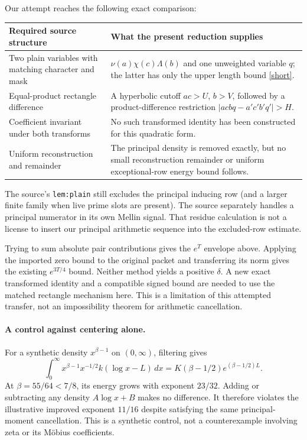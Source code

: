 \documentclass[11pt]{article}
\newcommand{\dd}{\,d}\newcommand{\E}{\mathcal E}\newcommand{\C}{\mathcal C}
\begin{document}
Our attempt reaches the following exact comparison:
\begin{center}\small
\begin{tabular}{p{.27\linewidth}p{.65\linewidth}}
\toprule
Required source structure & What the present reduction supplies\\
\midrule
Two plain variables with matching character and mask &
$\nu(a)\chi(c)\Lambda(b)$ and one unweighted variable $q$; the latter
has only the upper length bound \eqref{short}.\\[3pt]
Equal-product rectangle difference &
A hyperbolic cutoff $ac>U$, $b>V$, followed by a product-difference
restriction $|acbq-a'c'b'q'|>H$.\\[3pt]
Coefficient invariant under both transforms &
No such transformed identity has been constructed for this quadratic form.\\[3pt]
Uniform reconstruction and remainder &
The principal density is removed exactly, but no small reconstruction
remainder or uniform exceptional-row energy bound follows.\\
\bottomrule
\end{tabular}
\end{center}
The source's \texttt{lem:plain} still excludes the principal inducing
row (and a larger finite family when live prime slots are present).
The source separately handles a principal numerator in its own Mellin
signal. That residue calculation is not a license to insert our
principal arithmetic sequence into the excluded-row estimate.

Trying to sum absolute pair contributions gives the $e^T$ envelope
above. Applying the imported zero bound to the original packet and
transferring its norm gives the existing $e^{3T/4}$ bound. Neither
method yields a positive $\delta$. A new exact transformed identity
and a compatible signed bound are needed to use the matched rectangle
mechanism here. This is a limitation of this attempted transfer, not
an impossibility theorem for arithmetic cancellation.

\paragraph{A control against centering alone.}
For a synthetic density $x^{\beta-1}$ on $(0,\infty)$, filtering gives
\[
 \int_0^\infty x^{\beta-1}x^{-1/2}k(\log x-L)\dd x
 =K(\beta-1/2)e^{(\beta-1/2)L}.
\]
At $\beta=55/64<7/8$, its energy grows with exponent $23/32$.
Adding or subtracting any density $A\log x+B$ makes no difference.
It therefore violates the illustrative improved exponent $11/16$
despite satisfying the same principal-moment cancellation. This is
a synthetic control, not a counterexample involving zeta or its
M\"obius coefficients.
\end{document}
